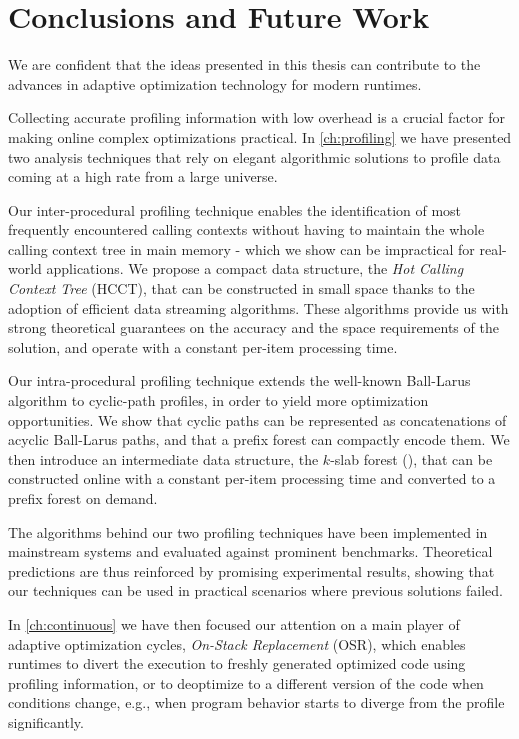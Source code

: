 
\chapter{Conclusions and Future Work}
\label{ch:conclusions}

We are confident that the ideas presented in this thesis can contribute to the advances in adaptive optimization technology for modern runtimes.

Collecting accurate profiling information with low overhead is a crucial factor for making online complex optimizations practical. In \mychapter\ref{ch:profiling} we have presented two analysis techniques that rely on elegant algorithmic solutions to profile data coming at a high rate from a large universe.

Our inter-procedural profiling technique enables the identification of most frequently encountered calling contexts without having to maintain the whole calling context tree in main memory - which we show can be impractical for real-world applications. We propose a compact data structure, the {\em Hot Calling Context Tree} (HCCT), that can be constructed in small space thanks to the adoption of efficient data streaming algorithms. These algorithms provide us with strong theoretical guarantees on the accuracy and the space requirements of the solution, and operate with a constant per-item processing time.

Our intra-procedural profiling technique extends the well-known Ball-Larus algorithm to cyclic-path profiles, in order to yield more optimization opportunities. We show that cyclic paths can be represented as concatenations of acyclic Ball-Larus paths, and that a prefix forest can compactly encode them. We then introduce an intermediate data structure, the $k$-slab forest (\ksf), that can be constructed online with a constant per-item processing time and converted to a prefix forest on demand.

The algorithms behind our two profiling techniques have been implemented in mainstream systems and evaluated against prominent benchmarks. Theoretical predictions are thus reinforced by promising experimental results, showing that our techniques can be used in practical scenarios where previous solutions failed.

In \mychapter\ref{ch:continuous} we have then focused our attention on a main player of adaptive optimization cycles, {\em On-Stack Replacement} (OSR), which enables runtimes to divert the execution to freshly generated optimized code using profiling information, or to deoptimize to a different version of the code when conditions change, e.g., when program behavior starts to diverge from the profile significantly.

